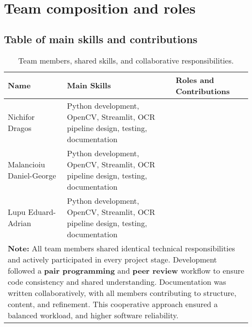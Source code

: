 \documentclass[runningheads,a4paper,11pt]{report}
\begin{document}
\tableofcontents

\newpage

\listoftables
\listoffigures
\listofalgorithms

\newpage




\newpage





\chapter{Team composition and roles}
\label{chapter:team}

\section{Table of main skills and contributions}

\begin{table}[h!]
\centering
\begin{tabular}{|l|p{5cm}|p{6cm}|}
\hline
\textbf{Name} & \textbf{Main Skills} & \textbf{Roles and Contributions} \\ \hline
Nichifor Dragos &
Python development, OpenCV, Streamlit, OCR pipeline design, testing, documentation &
\\ \hline
Malancioiu Daniel-George &
Python development, OpenCV, Streamlit, OCR pipeline design, testing, documentation &
\\ \hline
Lupu Eduard-Adrian &
Python development, OpenCV, Streamlit, OCR pipeline design, testing, documentation &
\\ \hline
\multicolumn{3}{|p{14cm}|}{
\textbf{Note:} All team members shared identical technical responsibilities and actively participated in every project stage.  
Development followed a \textbf{pair programming} and \textbf{peer review} workflow to ensure code consistency and shared understanding.  
Documentation was written collaboratively, with all members contributing to structure, content, and refinement.  
This cooperative approach ensured a balanced workload, and higher software reliability.
} \\ \hline
\end{tabular}
\caption{Team members, shared skills, and collaborative responsibilities.}
\end{table}
\end{document}
